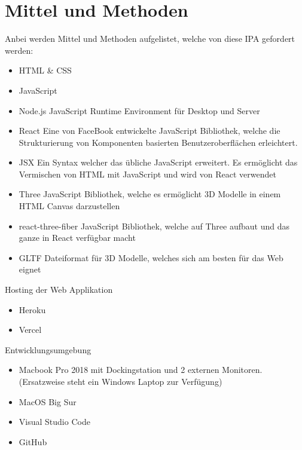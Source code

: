 \pagebreak
\section{Mittel und Methoden}
Anbei werden Mittel und Methoden aufgelistet, welche von diese IPA gefordert werden:
\begin{itemize}
  \item HTML \& CSS
  \item JavaScript
  \item Node.js JavaScript Runtime Environment für Desktop und Server
  \item React Eine von FaceBook entwickelte JavaScript Bibliothek, welche die Strukturierung von Komponenten basierten Benutzeroberflächen erleichtert.
  \item JSX Ein Syntax welcher das übliche JavaScript erweitert. Es ermöglicht das Vermischen von HTML mit JavaScript und wird
  von React verwendet
  \item Three JavaScript Bibliothek, welche es ermöglicht 3D Modelle in einem HTML Canvas darzustellen
  \item react-three-fiber JavaScript Bibliothek, welche auf Three aufbaut und das ganze in React verfügbar macht
  \item GLTF Dateiformat für 3D Modelle, welches sich am besten für das Web eignet
\end{itemize}

Hosting der Web Applikation
\begin{itemize}
  \item Heroku
  \item Vercel
\end{itemize}

Entwicklungsumgebung
\begin{itemize}
  \item Macbook Pro 2018 mit Dockingstation und 2 externen Monitoren. (Ersatzweise steht ein Windows Laptop zur Verfügung)
  \item MacOS Big Sur
  \item Visual Studio Code
  \item GitHub
\end{itemize}

